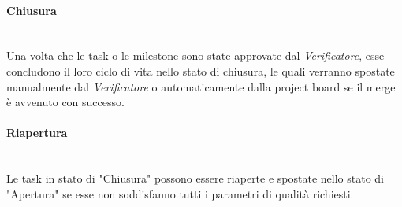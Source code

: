	
	\paragraph{Chiusura} \-\\
	Una volta che le task o le milestone sono state approvate dal \textit{Verificatore}, esse concludono il loro ciclo di vita nello stato di chiusura, le quali verranno spostate manualmente dal \textit{Verificatore} o automaticamente dalla project board se il merge è avvenuto con successo. 
	
\paragraph{Riapertura} \-\\ \label{ProcessiOrganizzativi_Riapertura}
	Le task in stato di "Chiusura" possono essere riaperte e spostate nello stato di "Apertura" se esse non soddisfanno tutti i parametri di qualità richiesti.